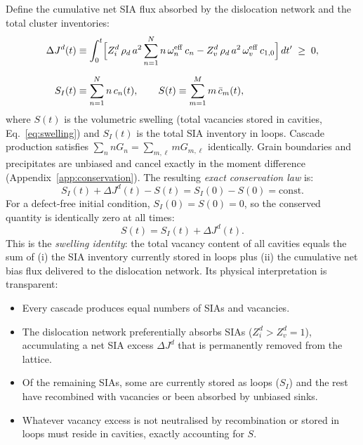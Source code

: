 Define the cumulative net SIA flux absorbed by the dislocation network
and the total cluster inventories:
\begin{align}
    \Delta J^d(t)
    &\equiv \int_0^t
      \Bigl[
        Z_i^d\,\rho_d\,a^2\sum_{n=1}^{N} n\,\omega_n^{\mathrm{eff}}\,c_n
      - Z_v^d\,\rho_d\,a^2\,\omega_v^{\mathrm{eff}}\,c_{1,0}
      \Bigr]\,dt'
    \;\geq\; 0,
    \label{eq:DeltaJd}\\[6pt]
    S_I(t) &\equiv \sum_{n=1}^{N} n\,c_n(t),
    \qquad
    S(t) \equiv \sum_{m=1}^{M} m\,\bar{c}_m(t),
    \label{eq:SI_S}
\end{align}
where $S(t)$ is the volumetric swelling (total vacancies stored in
cavities, Eq.~\ref{eq:swelling}) and $S_I(t)$ is the total SIA inventory
in loops. Cascade production satisfies
$\sum_n n G_n = \sum_{m,\ell} m G_{m,\ell}$ identically. Grain
boundaries and precipitates are unbiased and cancel exactly in the
moment difference (Appendix~\ref{app:conservation}). The resulting
\emph{exact conservation law} is:
\begin{equation}\label{eq:mass_FP}
\boxed{
    S_I(t) + \Delta J^d(t) - S(t) = S_I(0) - S(0) = \mathrm{const.}
}
\end{equation}
For a defect-free initial condition, $S_I(0) = S(0) = 0$, so the
conserved quantity is identically zero at all times:
\begin{equation}\label{eq:swelling_identity}
    S(t) = S_I(t) + \Delta J^d(t).
\end{equation}
This is the \emph{swelling identity}: the total vacancy content of all
cavities equals the sum of (i) the SIA inventory currently stored in
loops plus (ii) the cumulative net bias flux delivered to the dislocation
network. Its physical interpretation is transparent:
\begin{itemize}
    \item Every cascade produces equal numbers of SIAs and vacancies.
    \item The dislocation network preferentially absorbs SIAs
    ($Z_i^d > Z_v^d = 1$), accumulating a net SIA excess $\Delta J^d$
    that is permanently removed from the lattice.
    \item Of the remaining SIAs, some are currently stored as loops
    ($S_I$) and the rest have recombined with vacancies or been absorbed
    by unbiased sinks.
    \item Whatever vacancy excess is not neutralised by recombination or
    stored in loops must reside in cavities, exactly accounting for $S$.
\end{itemize}
